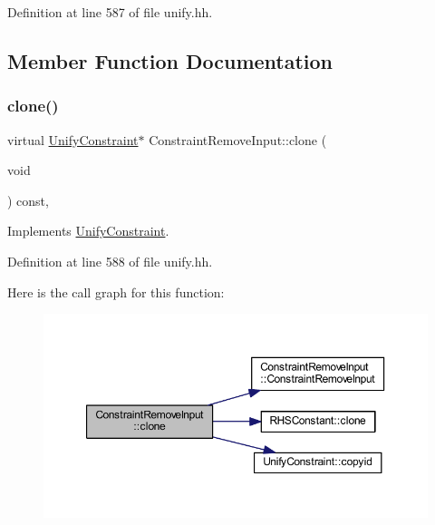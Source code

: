 Definition at line 587 of file unify.\+hh.



\subsection{Member Function Documentation}
\mbox{\label{class_constraint_remove_input_a619d3e7e57bb78322bbd889d123a5994}} 
\subsubsection{\texorpdfstring{clone()}{clone()}}
{\footnotesize\ttfamily virtual \mbox{\hyperlink{class_unify_constraint}{Unify\+Constraint}}$\ast$ Constraint\+Remove\+Input\+::clone (\begin{DoxyParamCaption}\item[{void}]{ }\end{DoxyParamCaption}) const\hspace{0.3cm}{\ttfamily [inline]}, {\ttfamily [virtual]}}



Implements \mbox{\hyperlink{class_unify_constraint_a4f068343932637d355644bb21559aa12}{Unify\+Constraint}}.



Definition at line 588 of file unify.\+hh.

Here is the call graph for this function\+:
\nopagebreak
\begin{figure}[H]
\begin{center}
\leavevmode
\includegraphics[width=350pt]{class_constraint_remove_input_a619d3e7e57bb78322bbd889d123a5994_cgraph}
\end{center}
\end{figure}
\mbox{\label{class_constraint_remove_input_a435c6f9bb7103060adbcb850f09a03e8}} 
